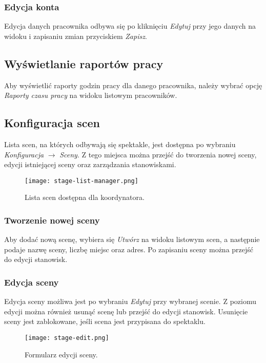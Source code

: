 \documentclass[shortabstract]{iithesis}
\begin{document}
\subsubsection{Edycja konta}

Edycja danych pracownika odbywa się po kliknięciu \textit{Edytuj} przy jego danych na widoku  i zapisaniu zmian przyciskiem \textit{Zapisz}.

\subsection{Wyświetlanie raportów pracy}

Aby wyświetlić raporty godzin pracy dla danego pracownika, należy wybrać opcję \textit{Raporty czasu pracy} na widoku listowym pracowników.

\subsection{Konfiguracja scen}
\label{stage-edit}

Lista scen, na których odbywają się spektakle, jest dostępna po wybraniu \textit{Konfiguracja} $\rightarrow$ \textit{Sceny}. Z tego miejsca można przejść do tworzenia nowej sceny, edycji istniejącej sceny oraz zarządzania stanowiskami.

\begin{figure}[H]
    \centering
    \texttt{[image: stage-list-manager.png]}
    \caption{Lista scen dostępna dla koordynatora.}
    \label{fig:stage-list-manager}
\end{figure}

\subsubsection{Tworzenie nowej sceny}
Aby dodać nową scenę, wybiera się \textit{Utwórz} na widoku listowym scen, a następnie podaje nazwę sceny, liczbę miejsc oraz adres. Po zapisaniu sceny można przejść do edycji stanowisk.

\subsubsection{Edycja sceny}
Edycja sceny możliwa jest po wybraniu \textit{Edytuj} przy wybranej scenie. Z poziomu edycji można również usunąć scenę lub przejść do edycji stanowisk. Usunięcie sceny jest zablokowane, jeśli scena jest przypisana do spektaklu.

\begin{figure}[H]
    \centering
    \texttt{[image: stage-edit.png]}
    \caption{Formularz edycji sceny.}
    \label{fig:stage-edit}
\end{figure}
\end{document}
